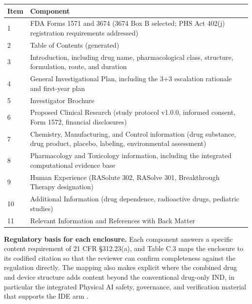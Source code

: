 \noindent\begin{tabularx}{\textwidth}{L{1.5cm} Y}
\toprule
\textbf{Item} & \textbf{Component} \\
 & FDA Forms 1571 and 3674 (3674 Box B selected; PHS Act 402(j) registration requirements addressed) \\
2 & Table of Contents (generated) \\
3 & Introduction, including drug name, pharmacological class, structure, formulation, route, and duration \\
4 & General Investigational Plan, including the 3+3 escalation rationale and first-year plan \\
5 & Investigator Brochure \\
6 & Proposed Clinical Research (study protocol v1.0.0, informed consent, Form 1572, financial disclosures) \\
7 & Chemistry, Manufacturing, and Control information (drug substance, drug product, placebo, labeling, environmental assessment) \\
8 & Pharmacology and Toxicology information, including the integrated computational evidence base \\
9 & Human Experience (RASolute 302, RASolve 301, Breakthrough Therapy designation) \\
10 & Additional Information (drug dependence, radioactive drugs, pediatric studies) \\
11 & Relevant Information and References with Back Matter \\
\bottomrule
\end{tabularx}
\vspace{-0.5cm}

\noindent\textbf{Regulatory basis for each enclosure.} Each component answers a specific content requirement of 21 CFR \S 312.23(a), and Table C.3 maps the enclosure to its codified citation so that the reviewer can confirm completeness against the regulation directly. The mapping also makes explicit where the combined drug and device structure adds content beyond the conventional drug-only IND, in particular the integrated Physical AI safety, governance, and verification material that supports the IDE arm \cite{cfr312paiuni,paiautospons}.

